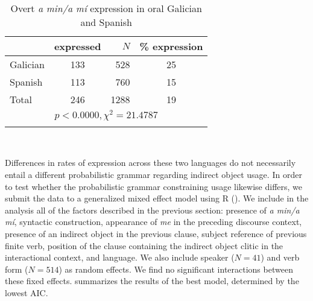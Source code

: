 \documentclass[output=paper]{langscibook}
\begin{document}
\begin{table}
\begin{tabular}{lcrc}

\lsptoprule
& {expressed} & $N$ & {\%} {expression}\\\midrule
Galician & 133 & 528 & 25\\
Spanish & 113 & 760 & 15\\
Total & 246 & 1288 & 19\\\cmidrule(lr){1-4}
\multicolumn{4}{c}{$p < 0.0000, \chi^2 = 21.4787$}\\
\lspbottomrule
\end{tabular}\\
\caption{Overt \textit{a min/a mí} expression in oral Galician and Spanish}
\label{tab:brown:1}
\end{table}

Differences in rates of expression across these two languages do not necessarily entail a different probabilistic grammar regarding indirect object usage. In order to test whether the probabilistic grammar constraining usage likewise differs, we submit the data to a generalized mixed effect model using R (\citealt{RCoreTeam2019}). We include in the analysis all of the factors described in the previous section: presence of \textit{a min\slash a mí}, syntactic construction, appearance of \textit{me} in the preceding discourse context, presence of an indirect object in the previous clause, subject reference of previous finite verb, position of the clause containing the indirect object clitic in the interactional context, and language. We also include speaker ($N=41$) and verb form ($N=514$) as random effects. We find no significant interactions between these fixed effects.  summarizes the results of the best model, determined by the lowest AIC.
\end{document}

